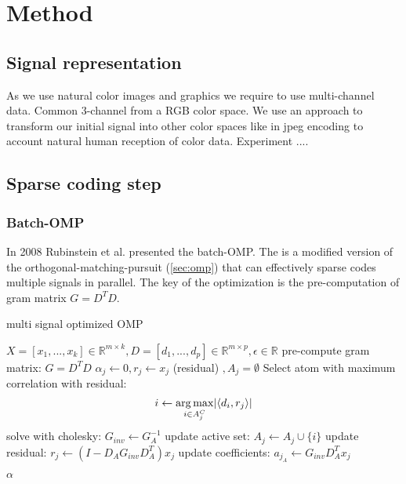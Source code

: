 \chapter{Method}


\section{Signal representation}
\label{sec:signal_representation}
As we use natural color images and graphics we require to use multi-channel
data. Common 3-channel from a RGB color space. %
We use an approach to transform our initial signal into other color spaces like
in jpeg encoding to account natural human reception of color data. Experiment
....


\section{Sparse coding step}
\subsection{Batch-OMP}
In 2008 Rubinstein et al.\cite{Rubinstein2008} presented the batch-OMP. The
 is a modified version of the
orthogonal-matching-pursuit (\ref{sec:omp}) that can effectively sparse codes
multiple signals in parallel. The key of the optimization is the pre-computation
of gram matrix $G=D^TD$.


\begin{algorithm}
\caption{multi signal optimized OMP}
\label{alg:batchOMP}
\begin{algorithmic}[1]
\REQUIRE $X =[x_1,...,x_k]  \in \mathbb{R}^{m \times k}, D  =[d_1,...,d_p]  \in \mathbb{R}^{m\times p}, \epsilon \in \mathbb{R}$
\STATE pre-compute gram matrix: $G=D^TD$
\STATE $\alpha_j \gets 0, r_j \gets x_j $ (residual) $, A_j=\emptyset$
\STATE Select atom with maximum correlation with residual: 
\begin{equation*}
i \gets \operatorname*{arg\,max}_{i \in A_j^C} \lvert \left<d_i,r_j\right> \rvert
\end{equation*}
\STATE solve with cholesky: $G_{inv} \gets G_A^{-1}$
\STATE update active set: $A_j \gets A_j \cup \{i\} $
\STATE update residual: $r_j \gets \left(I-D_AG_{inv}D_A^T \right)x_j$
\STATE update coefficients: $a_{j_A} \gets G_{inv} D_A^T x_j $
\ENDFOR 
\ENDFOR 

\RETURN $\alpha$
\end{algorithmic}
\end{algorithm}

